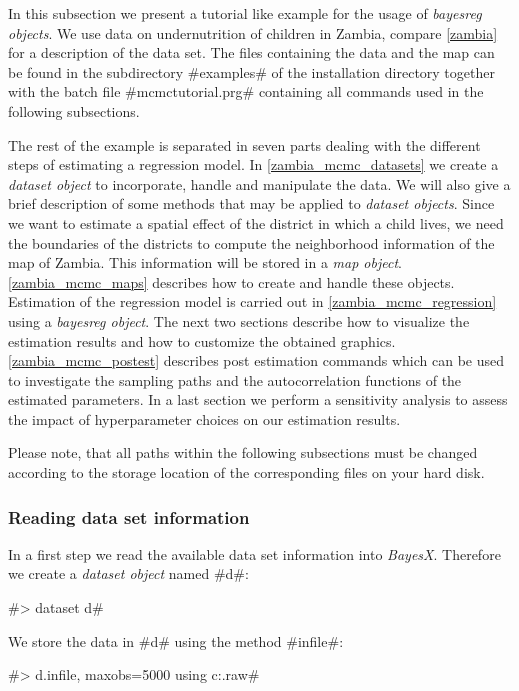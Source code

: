 \label{zambiaanalysis} In this subsection we present a tutorial
like example for the usage of {\em bayesreg objects}. We use data
on undernutrition of children in Zambia, compare \autoref{zambia}
for a description of the data set. The files containing the data
and the map can be found in the subdirectory #examples# of the
installation directory together with the batch file
#mcmctutorial.prg# containing all commands used in the following
subsections.

The rest of the example is separated in seven parts dealing with
the different steps of estimating a regression model. In
\autoref{zambia_mcmc_datasets} we create a {\em dataset object} to
incorporate, handle and manipulate the data. We will also give a
brief description of some methods that may be applied to {\em
dataset objects}. Since we want to estimate a spatial effect of
the district in which a child lives, we need the boundaries of the
districts to compute the neighborhood information of the map of
Zambia. This information will be stored in a {\em map object}.
\autoref{zambia_mcmc_maps} describes how to create and handle
these objects. Estimation of the regression model is carried out
in \autoref{zambia_mcmc_regression} using a {\em bayesreg object}.
The next two sections describe how to visualize the estimation
results and how to customize the obtained graphics.
\autoref{zambia_mcmc_postest} describes post estimation commands
which can be used to investigate the sampling paths and the
autocorrelation functions of the estimated parameters. In a last
section we perform a sensitivity analysis to assess the impact of
hyperparameter choices on our estimation results.

Please note, that all paths within the following subsections must
be changed according to the storage location of the corresponding
files on your hard disk.

\subsubsection{Reading data set
information}\label{zambia_mcmc_datasets}

In a first step we read the available data set information into
{\it BayesX}. Therefore we create a {\it dataset object} named
#d#:

#> dataset d#

We store the data in #d# using the method #infile#:

#> d.infile, maxobs=5000 using c:\data\zambia.raw#

